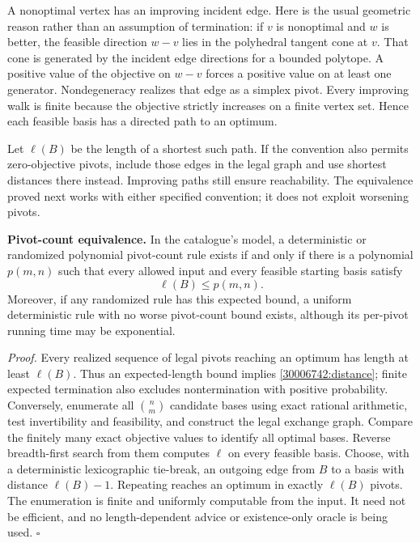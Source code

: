 \documentclass[11pt,a4paper]{article}
\numberwithin{equation}{section}
\begin{document}
A nonoptimal vertex has an improving incident edge.  Here is the usual
geometric reason rather than an assumption of termination: if $v$ is
nonoptimal and $w$ is better, the feasible direction $w-v$ lies in the
polyhedral tangent cone at $v$.  That cone is generated by the incident
edge directions for a bounded polytope.  A positive value of the
objective on $w-v$ forces a positive value on at least one generator.
Nondegeneracy realizes that edge as a simplex pivot.  Every improving
walk is finite because the objective strictly increases on a finite
vertex set.  Hence each feasible basis has a directed path to an optimum.

Let $\ell(B)$ be the length of a shortest such path.  If the convention
also permits zero-objective pivots, include those edges in the legal
graph and use shortest distances there instead.  Improving paths still
ensure reachability.  The equivalence proved next works with either
specified convention; it does not exploit worsening pivots.

\textbf{Pivot-count equivalence.}
In the catalogue's model, a deterministic or randomized polynomial
pivot-count rule exists if and only if there is a polynomial $p(m,n)$
such that every allowed input and every feasible starting basis satisfy
\begin{equation}\label{30006742:distance}
 \ell(B)\leq p(m,n).
\end{equation}
Moreover, if any randomized rule has this expected bound, a uniform
deterministic rule with no worse pivot-count bound exists, although
its per-pivot running time may be exponential.

\emph{Proof.} Every realized sequence of legal pivots reaching an
optimum has length at least $\ell(B)$.  Thus an expected-length bound
implies \eqref{30006742:distance}; finite expected termination also excludes
nontermination with positive probability.  Conversely, enumerate all
$\binom nm$ candidate bases using exact rational arithmetic, test
invertibility and feasibility, and construct the legal exchange graph.
Compare the finitely many exact objective values to identify all
optimal bases.  Reverse breadth-first search from them computes
$\ell$ on every feasible basis.  Choose, with a deterministic
lexicographic tie-break, an outgoing edge from $B$ to a basis with
distance $\ell(B)-1$.  Repeating reaches an optimum in exactly
$\ell(B)$ pivots.  The enumeration is finite and uniformly computable
from the input.  It need not be efficient, and no length-dependent
advice or existence-only oracle is being used. \hfill$\square$
\end{document}
